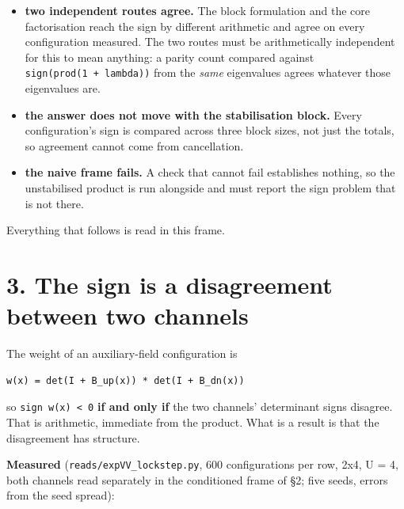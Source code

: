 \documentclass[10pt,letterpaper,twocolumn]{article}
\providecommand{\tightlist}{\setlength{\itemsep}{0pt}\setlength{\parskip}{0pt}}
\begin{document}
\begin{itemize}
\tightlist
\item
  \textbf{two independent routes agree.} The block formulation and the core factorisation reach the
  sign by different arithmetic and agree on every configuration measured. The two routes must be
  arithmetically independent for this to mean anything: a parity count compared against
  \texttt{sign(\allowbreak{}prod(\allowbreak{}1\ +\allowbreak{}\ lambda)\allowbreak{})\allowbreak{}} from the \emph{same} eigenvalues agrees whatever those eigenvalues are.
\item
  \textbf{the answer does not move with the stabilisation block.} Every configuration's sign is
  compared across three block sizes, not just the totals, so agreement cannot come from
  cancellation.
\item
  \textbf{the naive frame fails.} A check that cannot fail establishes nothing, so the unstabilised
  product is run alongside and must report the sign problem that is not there.
\end{itemize}

Everything that follows is read in this frame.

\section{3. The sign is a disagreement between two channels}\label{3-the-sign-is-a-disagreement-between-two-channels}

The weight of an auxiliary-field configuration is

\begin{verbatim}
w(x) = det(I + B_up(x)) * det(I + B_dn(x))
\end{verbatim}

so \texttt{sign\ w(\allowbreak{}x)\allowbreak{}\ \textless{}\allowbreak{}\ 0} \textbf{if and only if} the two channels' determinant signs disagree. That is
arithmetic, immediate from the product. What is a result is that the disagreement has structure.

\textbf{Measured} (\texttt{reads/\allowbreak{}expVV\_\allowbreak{}lockstep.\allowbreak{}py}, 600 configurations per row, 2x4, U = 4, both channels
read separately in the conditioned frame of §2; five seeds, errors from the seed spread):
\end{document}
